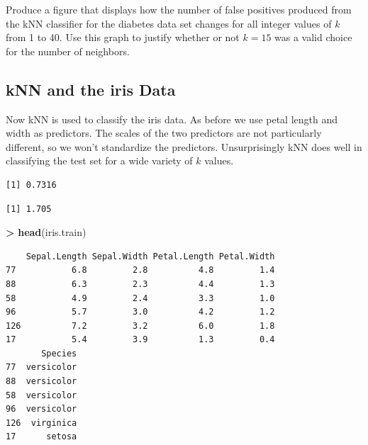 \documentclass[]{krantz}
\makeatletter
\newenvironment{Shaded}{\begin{snugshade}}{\end{snugshade}}
\newcommand{\KeywordTok}[1]{\textcolor[rgb]{0.27,0.27,0.27}{\textbf{#1}}}
\newcommand{\StringTok}[1]{\textcolor[rgb]{0.5,0.5,0.5}{#1}}
\newcommand{\OperatorTok}[1]{\textcolor[rgb]{0.43,0.43,0.43}{\textbf{#1}}}
\newcommand{\NormalTok}[1]{#1}
\newenvironment{kframe}{%
\medskip{}
\setlength{\fboxsep}{.8em}
 \def\at@end@of@kframe{}%
 \ifinner\ifhmode%
  \def\at@end@of@kframe{\end{minipage}}%
  \begin{minipage}{\columnwidth}%
 \fi\fi%
 \def\FrameCommand##1{\hskip\@totalleftmargin \hskip-\fboxsep
 \colorbox{shadecolor}{##1}\hskip-\fboxsep
     \hskip-\linewidth \hskip-\@totalleftmargin \hskip\columnwidth}%
 \MakeFramed {\advance\hsize-\width
   \@totalleftmargin\z@ \linewidth\hsize
   \@setminipage}}%
 {\par\unskip\endMakeFramed%
 \at@end@of@kframe}
\renewenvironment{Shaded}{\begin{kframe}}{\end{kframe}}
\makeatother
\begin{document}
Produce a figure that displays how the number of false positives
produced from the kNN classifier for the diabetes data set changes for
all integer values of \(k\) from 1 to 40. Use this graph to justify
whether or not \(k = 15\) was a valid choice for the number of
neighbors.

\subsection{kNN and the iris Data}\label{knn-and-the-iris-data}

Now kNN is used to classify the iris data. As before we use petal length
and width as predictors. The scales of the two predictors are not
particularly different, so we won't standardize the predictors.
Unsurprisingly kNN does well in classifying the test set for a wide
variety of \(k\) values.

\begin{Shaded}
\end{Shaded}

\begin{verbatim}
[1] 0.7316
\end{verbatim}

\begin{Shaded}
\end{Shaded}

\begin{verbatim}
[1] 1.705
\end{verbatim}

\begin{Shaded}
\begin{Highlighting}[]
\OperatorTok{>}\StringTok{ }\KeywordTok{head}\NormalTok{(iris.train)}
\end{Highlighting}
\end{Shaded}

\begin{verbatim}
    Sepal.Length Sepal.Width Petal.Length Petal.Width
77           6.8         2.8          4.8         1.4
88           6.3         2.3          4.4         1.3
58           4.9         2.4          3.3         1.0
96           5.7         3.0          4.2         1.2
126          7.2         3.2          6.0         1.8
17           5.4         3.9          1.3         0.4
       Species
77  versicolor
88  versicolor
58  versicolor
96  versicolor
126  virginica
17      setosa
\end{verbatim}
\end{document}
